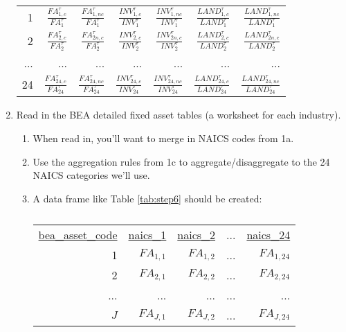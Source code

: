 \documentclass[a4paper]{article}
\begin{document}
\begin{enumerate}
\begin{table}[h!]
\begin{tabular}{rrrrrrr}
    1     & $\frac{FA^{\tau}_{1,c}}{FA^{\tau}_{1}}$ & $\frac{FA^{\tau}_{1,nc}}{FA^{\tau}_{1}}$ & $\frac{INV^{\tau}_{1,c}}{INV^{\tau}_{1}}$ & $\frac{INV^{\tau}_{1,nc}}{INV^{\tau}_{1}}$ & $\frac{LAND^{\tau}_{1,c}}{LAND^{\tau}_{1}}$ & $\frac{LAND^{\tau}_{1,nc}}{LAND^{\tau}_{1}}$ \\
    2     & $\frac{FA^{\tau}_{2,c}}{FA^{\tau}_{2}}$ & $\frac{FA^{\tau}_{2n,c}}{FA^{\tau}_{2}}$ & $\frac{INV^{\tau}_{2,c}}{INV^{\tau}_{2}}$ & $\frac{INV^{\tau}_{2n,c}}{INV^{\tau}_{2}}$ & $\frac{LAND^{\tau}_{2,c}}{LAND^{\tau}_{2}}$ & $\frac{LAND^{\tau}_{2n,c}}{LAND^{\tau}_{2}}$ \\
    ...     & ...    & ...     & ...     & ...     & ...     & ... \\
    24    & $\frac{FA^{\tau}_{24,c}}{FA^{\tau}_{24}}$ & $\frac{FA^{\tau}_{24,nc}}{FA^{\tau}_{24}}$ & $\frac{INV^{\tau}_{24,c}}{INV^{\tau}_{24}}$ & $\frac{INV^{\tau}_{24,nc}}{INV^{\tau}_{24}}$ & $\frac{LAND^{\tau}_{24,c}}{LAND^{\tau}_{24}}$ & $\frac{LAND^{\tau}_{24,nc}}{LAND^{\tau}_{24}}$ \\
    
    \end{tabular}%
  \label{tab:step5}%
\end{table}%


\item Read in the BEA detailed fixed asset tables (a worksheet for each industry).  
	\begin{enumerate}
	\item When read in, you'll want to merge in NAICS codes from 1a.
	\item Use the aggregation rules from 1c to aggregate/disaggregate to the 24 NAICS categories we'll use.
	\item A data frame like Table \ref{tab:step6} should be created:
	
\begin{table}[h!]
  \centering
  \caption{}
    \begin{tabular}{rrrrr}
    
    \underline{bea\_asset\_code} & \underline{naics\_1} & \underline{naics\_2} & ...     & \underline{naics\_24} \\
    
    1     & $FA_{1,1}$ & $FA_{1,2}$ & ...     & $FA_{1,24}$ \\
    2     & $FA_{2,1}$ & $FA_{2,2}$ & ...    & $FA_{2,24}$ \\
    ...   & ...     & ...     & ...     & ... \\
    $J$   & $FA_{J,1}$ & $FA_{J,2}$ & ...     & $FA_{J,24}$ \\
    

\end{tabular}
\end{table}
\end{enumerate}
\end{enumerate}
\end{document}
